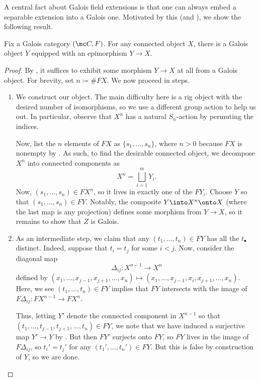 \documentclass{amsart}
\begin{document}
A central fact about Galois field extensions is that one can always embed a separable extension into a Galois one. Motivated by this (and ), we show the following result.
\begin{proposition} \label{prop:galois-cover}
    Fix a Galois category $(\mc C,F)$. For any connected object $X$, there is a Galois object $Y$ equipped with an epimorphism $Y\to X$.
\end{proposition}
\begin{proof}
    By , it suffices to exhibit some morphism $Y\to X$ at all from a Galois object. For brevity, set $n\coloneqq\#FX$. We now proceed in steps.
    \begin{enumerate}
        \item We construct our object. The main difficulty here is a rig object with the desired number of isomorphisms, so we use a different group action to help us out. In particular, observe that $X^{n}$ has a natural $S_n$-action by permuting the indices.

        Now, list the $n$ elements of $FX$ as $\{s_1,\ldots,s_n\}$, where $n>0$ because $FX$ is nonempty by . As such, to find the desirable connected object, we decompose $X^n$ into connected components as
        \[X^{n}=\bigsqcup_{i=1}^mY_i.\]
        Now, $(s_1,\ldots,s_n)\in FX^{n}$, so it lives in exactly one of the $FY_i$. Choose $Y$ so that $(s_1,\ldots,s_n)\in FY$. Notably, the composite $Y\into X^{n}\onto X$ (where the last map is any projection) defines some morphism from $Y\to X$, so it remains to show that $Z$ is Galois.

        \item As an intermediate step, we claim that any $(t_1,\ldots,t_n)\in FY$ has all the $t_\bullet$ distinct. Indeed, suppose that $t_i=t_j$ for some $i<j$. Now, consider the diagonal map
        \[\Delta_{ij}\colon X^{n-1}\to X^n\]
        defined by $(x_1,\ldots,x_{j-1},x_{j+1},\ldots,x_n)\mapsto(x_1,\ldots,x_{j-1},x_i,x_{j+1},\ldots,x_n)$. Here, we see $(t_1,\ldots,t_n)\in FY$ implies that $FY$ intersects with the image of $F\Delta_{ij}\colon FX^{n-1}\to FX^n$.
        
        Thus, letting $Y'$ denote the connected component in $X^{n-1}$ so that $(t_1,\ldots,t_{j-1},t_{j+1},\ldots,t_n)\in FY$, we note that we have induced a surjective map $Y'\to Y$ by . But then $FY'$ surjects onto $FY$, so $FY$ lives in the image of $F\Delta_{ij}$, so $t_i'=t_j'$ for any $(t_1',\ldots,t_n')\in FY$. But this is false by construction of $Y$, so we are done.


\end{enumerate}
\end{proof}
\end{document}
